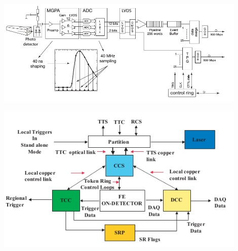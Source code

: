 \vspace{5mm}
\begin{minipage}{0.99\textwidth} 
\begin{center}
\mbox{
\includegraphics[height=0.6\textwidth, width=0.9\textwidth]{THESISPLOTS/ReadOut.png}
}
\label{fig:readout1}
\end{center}
\end{minipage}


\vspace{5mm}
\begin{minipage}{0.99\textwidth} 
\begin{center}
\mbox{
\includegraphics[height=0.6\textwidth, width=0.9\textwidth]{THESISPLOTS/ECAL-Off-Detector-and-ReadOut-Electronics.png}
}
\label{fig:readout}
\end{center}
\end{minipage}



